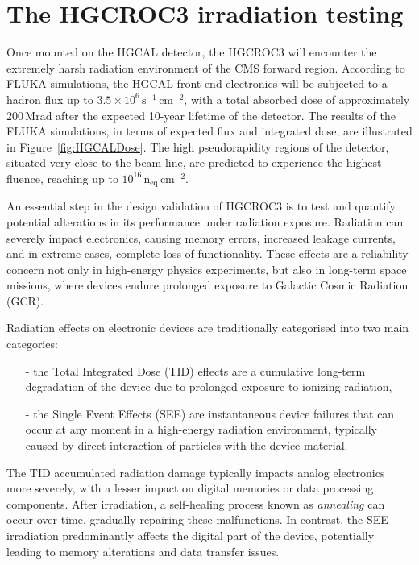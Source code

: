 \section{The HGCROC3 irradiation testing}
\label{sec:The HGCROC3 irradiation testing}

Once mounted on the HGCAL detector, the HGCROC3 will encounter the extremely harsh radiation environment of the CMS forward region. According to FLUKA \cite{fluka} simulations, the HGCAL front-end electronics will be subjected to a hadron flux up to $3.5\times10^6\,\textrm{s}^{-1}\,\textrm{cm}^{-2}$, with a total absorbed dose of approximately $200\,\textrm{Mrad}$ after the expected 10-year lifetime of the detector. 
The results of the FLUKA simulations, in terms of expected flux and integrated dose, are illustrated in Figure~\ref{fig:HGCALDose}. The high pseudorapidity regions of the detector, situated very close to the beam line, are predicted to experience the highest fluence, reaching up to $10^{16}\,\textrm{n}_{\textrm{eq}}\,\textrm{cm}^{-2}$.

\bigbreak

An essential step in the design validation of HGCROC3 is to test and quantify potential alterations in its performance under radiation exposure.
Radiation can severely impact electronics, causing memory errors, increased leakage currents, and in extreme cases, complete loss of functionality. These effects are a reliability concern not only in high-energy physics experiments, but also in long-term space missions, where devices endure prolonged exposure to Galactic Cosmic Radiation (GCR).

Radiation effects on electronic devices are traditionally categorised into two main categories:
\begin{itemize}
    \item [-] the Total Integrated Dose (TID) effects are a cumulative long-term degradation of the device due to prolonged exposure to ionizing radiation,
    \item [-] the Single Event Effects (SEE) are instantaneous device failures that can occur at any moment in a high-energy radiation environment, typically caused by direct interaction of particles with the device material.
\end{itemize}

The TID accumulated radiation damage typically impacts analog electronics more severely, with a lesser impact on digital memories or data processing components. After irradiation, a self-healing process known as \textit{annealing} can occur over time, gradually repairing these malfunctions.
In contrast, the SEE irradiation predominantly affects the digital part of the device, potentially leading to memory alterations and data transfer issues.

